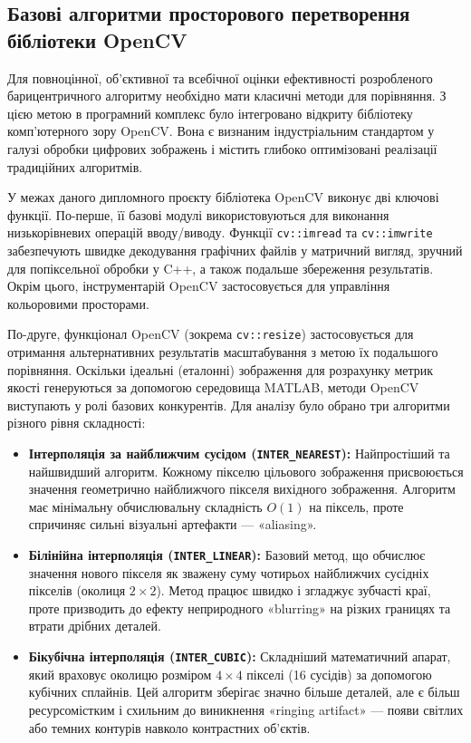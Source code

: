 \subsection{Базові алгоритми просторового перетворення бібліотеки OpenCV}

Для повноцінної, об'єктивної та всебічної оцінки ефективності розробленого барицентричного алгоритму необхідно мати класичні методи для порівняння. З цією метою в програмний комплекс було інтегровано відкриту бібліотеку комп'ютерного зору OpenCV. Вона є визнаним індустріальним стандартом у галузі обробки цифрових зображень і містить глибоко оптимізовані реалізації традиційних алгоритмів.

У межах даного дипломного проєкту бібліотека OpenCV виконує дві ключові функції. По-перше, її базові модулі використовуються для виконання низькорівневих операцій вводу/виводу. Функції \texttt{cv::imread} та \texttt{cv::imwrite} забезпечують швидке декодування графічних файлів у матричний вигляд, зручний для попіксельної обробки у C++, а також подальше збереження результатів. Окрім цього, інструментарій OpenCV застосовується для управління кольоровими просторами.

По-друге, функціонал OpenCV (зокрема \texttt{cv::resize}) застосовується для отримання альтернативних результатів масштабування з метою їх подальшого порівняння. Оскільки ідеальні (еталонні) зображення для розрахунку метрик якості генеруються за допомогою середовища MATLAB, методи OpenCV виступають у ролі базових конкурентів. Для аналізу було обрано три алгоритми різного рівня складності:

\begin{itemize}
	\item \textbf{Інтерполяція за найближчим сусідом (\texttt{INTER\_NEAREST}):} Найпростіший та найшвидший алгоритм. Кожному пікселю цільового зображення присвоюється значення геометрично найближчого пікселя вихідного зображення. Алгоритм має мінімальну обчислювальну складність $O(1)$ на піксель, проте спричиняє сильні візуальні артефакти — «aliasing».
	
	\item \textbf{Білінійна інтерполяція (\texttt{INTER\_LINEAR}):} Базовий метод, що обчислює значення нового пікселя як зважену суму чотирьох найближчих сусідніх пікселів (околиця $2 \times 2$). Метод працює швидко і згладжує зубчасті краї, проте призводить до ефекту неприродного «blurring» на різких границях та втрати дрібних деталей.
	
	\item \textbf{Бікубічна інтерполяція (\texttt{INTER\_CUBIC}):} Складніший математичний апарат, який враховує околицю розміром $4 \times 4$ пікселі (16 сусідів) за допомогою кубічних сплайнів. Цей алгоритм зберігає значно більше деталей, але є більш ресурсомістким і схильним до виникнення «ringing artifact» — появи світлих або темних контурів навколо контрастних об'єктів.
	
\end{itemize}

